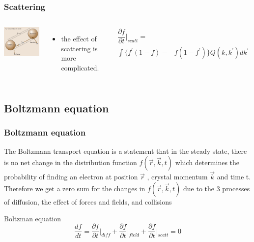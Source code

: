 \documentclass{beamer}
\begin{document}
\begin{frame}
\frametitle{Scattering}
\begin{columns}
\pause
\includegraphics[scale=.4]{scattering}
\begin{itemize}
\pause
\item the effect of scattering is more complicated.
\end{itemize}
\pause
\begin{align*}
&\dfrac{\partial f}{\partial t}\Big| _{scatt} = \\& \int \big\{ f^\prime (1-f) - &f(1-f^\prime) \big\} Q(k,k^\prime) dk^\prime 
\end{align*}
\end{columns}
\end{frame}
\subsection{Boltzmann equation}
\begin{frame}
\frametitle{Boltzmann equation}
The Boltzmann transport equation is a statement that in the steady state, there is no net
change in the distribution function $f (\vec{r}, \vec{k}, t)$ which determines the probability of finding an electron at position $\vec{r}$ , crystal momentum $\vec{k}$ and time t. Therefore we get a zero sum for the changes in $f (\vec{r}, \vec{k}, t)$ due to the 3 processes of diffusion, the effect of forces and fields, and collisions
\pause
\begin{theorem}{Boltzman equation}
\begin{equation*}
\dfrac{df}{dt}=\dfrac{\partial f}{\partial t}\big| _{diff} +\dfrac{\partial f}{\partial t}\big| _{field}+ \dfrac{\partial f}{\partial t}\big| _{scatt} = 0
\end{equation*}
\end{theorem}
\end{frame}
\end{document}
